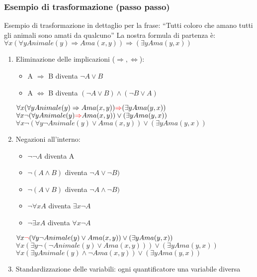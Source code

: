 \documentclass{article}
\begin{document}
\subsubsection{Esempio di trasformazione (passo passo)}
Esempio di trasformazione in dettaglio per la frase: \newline
“Tutti coloro che amano tutti gli animali sono amati da qualcuno” \newline 
La nostra formula di partenza è: $\forall x ( \forall y Animale(y) \Rightarrow Ama(x,y)) \Rightarrow (\exists y Ama(y, x))$
\begin{enumerate}
    \item Eliminazione delle implicazioni ($\Rightarrow, \Leftrightarrow$):
        \begin{itemize}
            \item A $\Rightarrow$ B diventa	$\neg A \lor B$
            \item A $\Leftrightarrow$ B diventa $(\neg A \lor B) \land (\neg B \lor A)$
        \end{itemize}
    $\forall x (\forall y Animale(y) \Rightarrow Ama(x,y)) \textcolor{red}{\Rightarrow} (\exists y Ama(y, x))$ \newline
    $\forall x \neg (\forall y Animale(y) \textcolor{red}{\Rightarrow} Ama(x,y)) \lor (\exists y Ama(y, x))$ \newline
    $\forall x \neg (\forall y \neg Animale(y) \lor Ama(x,y)) \lor (\exists y Ama(y, x))$
    \item Negazioni all'interno:
        \begin{itemize}
            \item $\neg \neg A$ diventa A
            \item $\neg (A \land B)$ diventa $\neg A \lor \neg B)$
            \item $\neg (A \lor B)$ diventa $\neg A \land \neg B)$
            \item $\neg \forall x A$ diventa $\exists x \neg A$
            \item $\neg \exists x A $ diventa $\forall x \neg A$
        \end{itemize}
    $\forall x \textcolor{red}{\neg} (\forall y \neg Animale(y) \lor Ama(x,y)) \lor (\exists y Ama(y, x))$ \newline
    $\forall x (\exists y \neg (\neg Animale(y) \lor Ama(x,y))) \lor (\exists y Ama(y, x))$ \newline
    $\forall x (\exists y Animale(y) \land \neg Ama(x,y)) \lor (\exists y Ama(y, x))$
    \item Standardizzazione delle variabili: ogni quantificatore una variabile diversa \newline

\end{enumerate}
\end{document}

